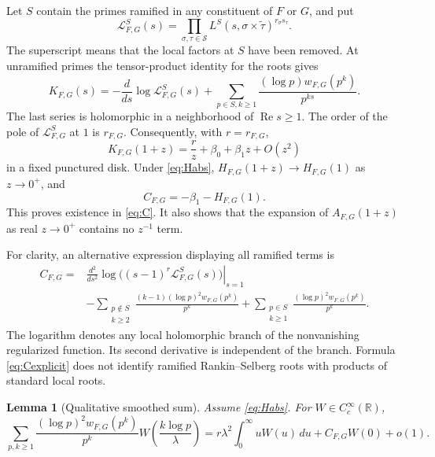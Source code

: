 \documentclass[11pt]{article}
\numberwithin{equation}{section}
\newtheorem{lemma}[theorem]{Lemma}
\theoremstyle{remark}
\newcommand{\R}{\mathbb R}
\newcommand{\Rea}{\operatorname{Re}}
\newcommand{\wt}{\widetilde}
\begin{document}
Let $S$ contain the primes ramified in any constituent of $F$ or $G$,
and put
\[
 \mathcal L^S_{F,G}(s)=
 \prod_{\sigma,\tau\in\mathcal S}
 L^S(s,\sigma\times\wt\tau)^{r_\sigma s_\tau}.
\]
The superscript means that the local factors at $S$ have been removed.
At unramified primes the tensor-product identity for the roots gives
\begin{equation}\label{eq:badprimes}
 K_{F,G}(s)=-\frac{d}{ds}\log\mathcal L^S_{F,G}(s)
 +\sum_{p\in S,k\geq1}\frac{(\log p)w_{F,G}(p^k)}{p^{ks}}.
\end{equation}
The last series is holomorphic in a neighborhood of $\Rea s\geq1$.
The order of the pole of $\mathcal L^S_{F,G}$ at $1$ is $r_{F,G}$.
Consequently, with $r=r_{F,G}$,
\begin{equation}\label{eq:Laurent}
 K_{F,G}(1+z)=\frac r z+\beta_0+\beta_1z+O(z^2)
\end{equation}
in a fixed punctured disk. Under \eqref{eq:Habs},
$H_{F,G}(1+z)\to H_{F,G}(1)$ as $z\to0^+$, and
\begin{equation}\label{eq:Cbeta}
 C_{F,G}=-\beta_1-H_{F,G}(1).
\end{equation}
This proves existence in \eqref{eq:C}. It also shows that the expansion
of $A_{F,G}(1+z)$ as real $z\to0^+$ contains no $z^{-1}$ term.

For clarity, an alternative expression displaying all ramified terms is
\begin{equation}\label{eq:Cexplicit}
\begin{split}
 C_{F,G}={}&
 \left.\frac{d^2}{ds^2}
       \log\big((s-1)^r\mathcal L^S_{F,G}(s)\big)\right|_{s=1}\\
 &-\sum_{\substack{p\notin S\\k\geq2}}
       \frac{(k-1)(\log p)^2w_{F,G}(p^k)}{p^k}
 +\sum_{\substack{p\in S\\k\geq1}}
       \frac{(\log p)^2w_{F,G}(p^k)}{p^k}.
\end{split}
\end{equation}
The logarithm denotes any local holomorphic branch of the nonvanishing
regularized function. Its second derivative is independent of the
branch. Formula \eqref{eq:Cexplicit} does not identify ramified
Rankin--Selberg roots with products of standard local roots.

\begin{lemma}[Qualitative smoothed sum]\label{lem:smoothed}
Assume \eqref{eq:Habs}. For $W\in C_c^\infty(\R)$,
\begin{equation}\label{eq:smoothed}
 \sum_{p,k\geq1}\frac{(\log p)^2w_{F,G}(p^k)}{p^k}
 W\!\left(\frac{k\log p}{\lambda}\right)
 =r\lambda^2\int_0^\infty uW(u)\,du+C_{F,G}W(0)+o(1).
\end{equation}
\end{lemma}
\end{document}
